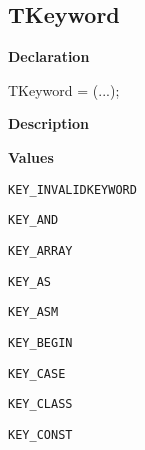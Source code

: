 \documentclass{report}
\newif\ifpdf
\begin{document}
\subsection*{TKeyword}
\fi
\label{PasDoc_Tokenizer-TKeyword}
\begin{list}{}{
\setlength{\itemindent}{0cm}
\setlength{\listparindent}{0cm}
\setlength{\leftmargin}{\evensidemargin}
\addtolength{\leftmargin}{\tmplength}
\settowidth{\labelsep}{X}
\addtolength{\leftmargin}{\labelsep}
\setlength{\labelwidth}{\tmplength}
}
\item[\textbf{Declaration}\hfill]
\ifpdf
\begin{flushleft}
\fi
\begin{ttfamily}
TKeyword = (...);\end{ttfamily}

\ifpdf
\end{flushleft}
\fi

\par
\item[\textbf{Description}]
 \item[\textbf{Values}]
\begin{description}
\item[\texttt{KEY{\_}INVALIDKEYWORD}] \label{PasDoc_Tokenizer-KEY_INVALIDKEYWORD}
\index{}
 
\item[\texttt{KEY{\_}AND}] \label{PasDoc_Tokenizer-KEY_AND}
\index{}
 
\item[\texttt{KEY{\_}ARRAY}] \label{PasDoc_Tokenizer-KEY_ARRAY}
\index{}
 
\item[\texttt{KEY{\_}AS}] \label{PasDoc_Tokenizer-KEY_AS}
\index{}
 
\item[\texttt{KEY{\_}ASM}] \label{PasDoc_Tokenizer-KEY_ASM}
\index{}
 
\item[\texttt{KEY{\_}BEGIN}] \label{PasDoc_Tokenizer-KEY_BEGIN}
\index{}
 
\item[\texttt{KEY{\_}CASE}] \label{PasDoc_Tokenizer-KEY_CASE}
\index{}
 
\item[\texttt{KEY{\_}CLASS}] \label{PasDoc_Tokenizer-KEY_CLASS}
\index{}
 
\item[\texttt{KEY{\_}CONST}] \label{PasDoc_Tokenizer-KEY_CONST}
\index{}
 

\end{description}
\end{list}
\end{document}
